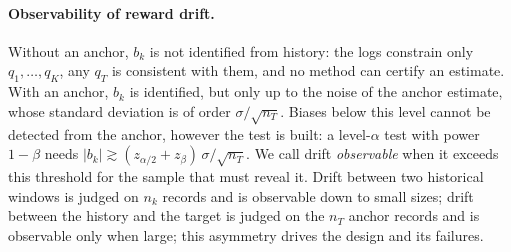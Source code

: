 \paragraph{Observability of reward drift.}
Without an anchor, $b_k$ is not identified from history: the logs constrain only
$q_1,\dots,q_K$, any $q_T$ is consistent with them, and no method can certify an estimate. With
an anchor, $b_k$ is identified, but only up to the noise of the anchor estimate, whose
standard deviation is of order $\sigma/\sqrt{n_T}$. Biases below this level cannot be
detected from the anchor, however the test is built: a level-$\alpha$ test with power
$1-\beta$ needs $|b_k|\gtrsim(z_{\alpha/2}+z_\beta)\,\sigma/\sqrt{n_T}$. We call drift
\emph{observable} when it exceeds this threshold for the sample that must reveal it. Drift
between two historical windows is judged on $n_k$ records and is observable down to small
sizes; drift between the history and the target is judged on the $n_T$ anchor records and is
observable only when large; this asymmetry drives the design and its failures.
